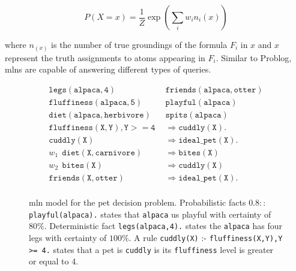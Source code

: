 $$ P(X=x) = \frac{1}{Z} \exp \left(  \sum_{i}w_in_i(x) \right) $$

where $n_(x)$ is the number of true groundings of the formula $F_i$ in $x$ and $x$ represent the truth assignments to atoms appearing in $F_i$.
Similar to Problog, \gls{mln}s are capable of answering different types of queries.




\begin{figure}
	$$\begin{aligned}
		{\mathtt {legs(alpaca,4)}} ~~~~&{\mathtt {friends(alpaca,otter)}} \nonumber \\
		{\mathtt {fluffiness(alpaca,5)}} ~~~~&{\mathtt {playful(alpaca)}} \nonumber \\
		{\mathtt {diet(alpaca,herbivore)}} ~~~~&{\mathtt {spits(alpaca)}} \nonumber \\
		{\mathtt {fluffiness(X,Y),Y >= 4}} &\Rightarrow  \mathtt {cuddly(X)}. \nonumber \\
		{\mathtt {cuddly(X)}} &\Rightarrow \mathtt {ideal\_pet(X)}. \nonumber \\
		w_1 ~~ {\mathtt {diet(X,carnivore)}} &\Rightarrow {\mathtt {bites(X)}} \nonumber \\
		w_2 ~~ {\mathtt {bites(X)}} &\Rightarrow {\mathtt {cuddly(X)}}  \nonumber \\
		{\mathtt {friends(X,otter)}} &\Rightarrow {\mathtt {ideal\_pet(X)}}. \nonumber \\
	\end{aligned}$$
	\caption[The \gls{mln} translation of the Problog program in Figure~\ref{fig:problog}]{\gls{mln} model for the pet decision problem. Probabilistic facts  $0.8::$\texttt {playful(alpaca).} states that \texttt{alpaca} us playful with certainty of $80 \%$. Deterministic fact \texttt{legs(alpaca,4).} states the \texttt{alpaca} has four legs with certainty of $100 \%$.  A rule \texttt{cuddly(X)} :- \texttt{fluffiness(X,Y),Y >= 4.} states that a pet is \texttt{cuddly} is its \texttt{fluffiness} level is greater or equal to 4. \label{fig:mln}}
\end{figure}










\cleardoublepage

